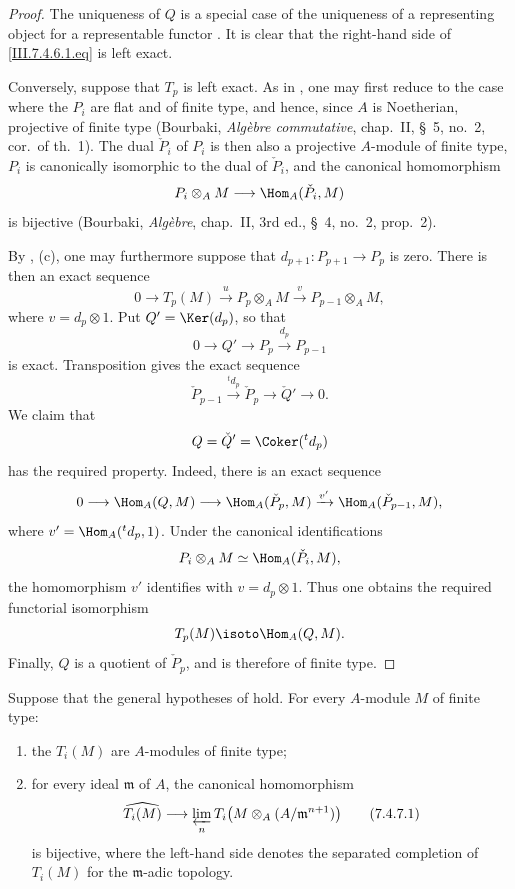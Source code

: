 \begin{proof}
The uniqueness of $Q$ is a special case of the uniqueness of a
representing object for a representable functor
.  It is clear that the right-hand side of
\eqref{III.7.4.6.1.eq} is left exact.

Conversely, suppose that $T_p$ is left exact.  As in
, one may first reduce to the case where the
$P_i$ are flat and of finite type, and hence, since $A$ is
Noetherian, projective of finite type (Bourbaki,
\emph{Alg\`ebre commutative}, chap.~II, \S~5, no.~2, cor.\ of
th.~1).  The dual $\check{P}_i$ of $P_i$ is then also a
projective $A$-module of finite type, $P_i$ is canonically
isomorphic to the dual of $\check{P}_i$, and the canonical
homomorphism
\[
  P_i\otimes_A M
  \longrightarrow
  \Hom_A(\check{P}_i,M)
\]
is bijective (Bourbaki, \emph{Alg\`ebre}, chap.~II,
3rd ed., \S~4, no.~2, prop.~2).

By , (c), one may furthermore suppose that
$d_{p+1}:P_{p+1}\to P_p$ is zero.  There is then an exact
sequence
\[
  0
  \longrightarrow T_p(M)
  \xrightarrow{u}
  P_p\otimes_A M
  \xrightarrow{v}
  P_{p-1}\otimes_A M,
\]
where $v=d_p\otimes 1$.  Put $Q'=\Ker(d_p)$, so that
\[
  0
  \longrightarrow Q'
  \longrightarrow P_p
  \xrightarrow{d_p}
  P_{p-1}
\]
is exact.  Transposition gives the exact sequence
\[
  \check{P}_{p-1}
  \xrightarrow{{}^t d_p}
  \check{P}_p
  \longrightarrow
  \check{Q}'
  \longrightarrow 0.
\]
We claim that
\[
  Q=\check{Q}'=\Coker({}^t d_p)
\]
has the required property.  Indeed, there is an exact sequence
\[
  0
  \longrightarrow \Hom_A(Q,M)
  \longrightarrow \Hom_A(\check{P}_p,M)
  \xrightarrow{v'}
  \Hom_A(\check{P}_{p-1},M),
\]
where $v'=\Hom_A({}^t d_p,1)$.  Under the canonical
identifications
\[
  P_i\otimes_A M\simeq\Hom_A(\check{P}_i,M),
\]
the homomorphism $v'$ identifies with $v=d_p\otimes 1$.
Thus one obtains the required functorial isomorphism
\[
  T_p(M)\isoto\Hom_A(Q,M).
\]
Finally, $Q$ is a quotient of $\check{P}_p$, and is therefore
of finite type.
\end{proof}

\begin{proposition}[7.4.7]
\label{III.7.4.7}
Suppose that the general hypotheses of  hold.
For every $A$-module $M$ of finite type:
\begin{enumerate}
  \item[(i)] the $T_i(M)$ are $A$-modules of finite type;
  \item[(ii)] for every ideal $\mathfrak m$ of $A$, the
    canonical homomorphism
    \[
      \widehat{T_i(M)}
      \longrightarrow
      \varprojlim_n
      T_i\bigl(M\otimes_A(A/\mathfrak m^{n+1})\bigr)
      \tag{7.4.7.1}\label{III.7.4.7.1.eq}
    \]
    is bijective, where the left-hand side denotes the
    separated completion of $T_i(M)$ for the
    $\mathfrak m$-adic topology.
\end{enumerate}
\end{proposition}

